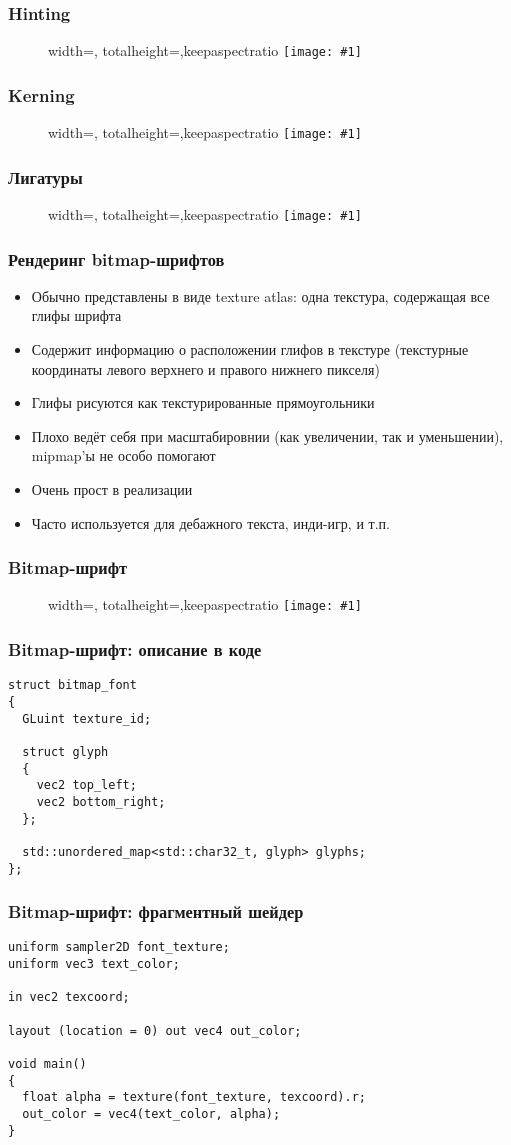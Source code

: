 \documentclass{beamer}
\newcommand{\slideimage}[1]{
  \begin{figure}
    \begin{adjustbox}{width=\textwidth, totalheight=\textheight-2\baselineskip-2\baselineskip,keepaspectratio}
      \texttt{[image: \#1]}
    \end{adjustbox}
  \end{figure}
}
\begin{document}
\begin{frame}[fragile]
\frametitle{Hinting}
\slideimage{hinting.png}
\end{frame}

\begin{frame}[fragile]
\frametitle{Kerning}
\slideimage{kerning.png}
\end{frame}

\begin{frame}[fragile]
\frametitle{Лигатуры}
\slideimage{ligatures.png}
\end{frame}

\begin{frame}[fragile]
\frametitle{Рендеринг bitmap-шрифтов}
\begin{itemize}
\item Обычно представлены в виде texture atlas: одна текстура, содержащая все глифы шрифта
\pause
\item Содержит информацию о расположении глифов в текстуре (текстурные координаты левого верхнего и правого нижнего пикселя)
\pause
\item Глифы рисуются как текстурированные прямоугольники
\pause
\item Плохо ведёт себя при масштабировнии (как увеличении, так и уменьшении), mipmap'ы не особо помогают
\pause
\item Очень прост в реализации
\pause
\item Часто используется для дебажного текста, инди-игр, и т.п.
\end{itemize}
\end{frame}

\begin{frame}[fragile]
\frametitle{Bitmap-шрифт}
\slideimage{bitmap-font.png}
\end{frame}

\begin{frame}[fragile]
\frametitle{Bitmap-шрифт: описание в коде}
\begin{verbatim}
struct bitmap_font
{
  GLuint texture_id;

  struct glyph
  {
    vec2 top_left;
    vec2 bottom_right;
  };

  std::unordered_map<std::char32_t, glyph> glyphs;
};
\end{verbatim}
\end{frame}

\begin{frame}[fragile]
\frametitle{Bitmap-шрифт: фрагментный шейдер}
\begin{verbatim}
uniform sampler2D font_texture;
uniform vec3 text_color;

in vec2 texcoord;

layout (location = 0) out vec4 out_color;

void main()
{
  float alpha = texture(font_texture, texcoord).r;
  out_color = vec4(text_color, alpha);
}
\end{verbatim}
\end{frame}
\end{document}
